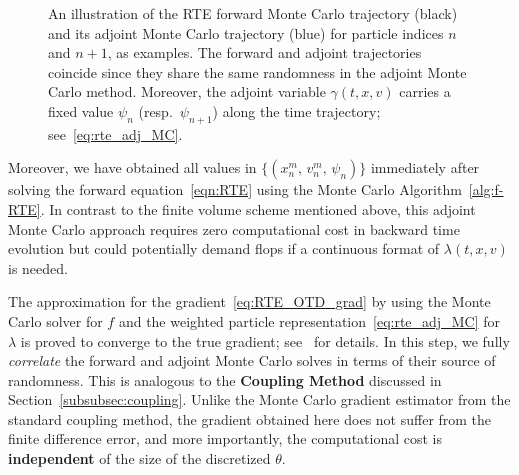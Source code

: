 \documentclass[12pt]{amsart}
\begin{document}
\begin{figure}
\begin{center}
\end{center}
\caption{An illustration of the RTE forward Monte Carlo trajectory (black) and its adjoint Monte Carlo trajectory (blue) for particle indices $n$ and $n+1$, as examples. The forward and adjoint trajectories coincide since they share the same randomness in the adjoint Monte Carlo method. Moreover, the adjoint variable $\gamma(t,x,v)$ carries a fixed value $\psi_n$ (resp.~$\psi_{n+1}$) along the time trajectory; see~\eqref{eq:rte_adj_MC}.\label{fig:RTE}}
\end{figure}

Moreover, we have obtained all values  in $\{ \left( x_n^m,\, v_n^m, \, \psi_n \right) \}$ immediately after solving the forward equation~\eqref{eqn:RTE} using the Monte Carlo Algorithm~\ref{alg:f-RTE}. In contrast to the finite volume scheme mentioned above, this adjoint Monte Carlo approach requires zero computational cost in backward time evolution but could potentially demand flops if a continuous format of $\lambda(t,x,v)$ is needed.

The approximation for the gradient~\eqref{eq:RTE_OTD_grad} by using the Monte Carlo solver for $f$ and the weighted particle representation~\eqref{eq:rte_adj_MC} for $\lambda$ is proved to converge to the true gradient; see~\cite[Theorem 2.2]{li2022monte} for details. In this step, we fully \textit{correlate} the forward and adjoint Monte Carlo solves in terms of their source of randomness. This is analogous to the \textbf{Coupling Method} discussed in Section~\ref{subsubsec:coupling}. Unlike the Monte Carlo gradient estimator from the standard coupling method, the gradient obtained here  does not suffer from the finite difference error, and more importantly, the computational cost is \textbf{independent} of the size of the discretized $\theta$.
\end{document}

